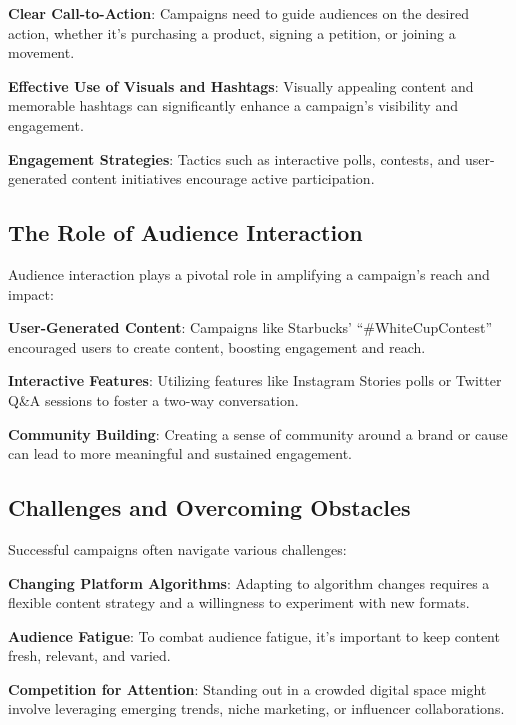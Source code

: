 \documentclass[
]{book}
\begin{document}
\textbf{Clear Call-to-Action}: Campaigns need to guide audiences on the desired action, whether it's purchasing a product, signing a petition, or joining a movement.

\textbf{Effective Use of Visuals and Hashtags}: Visually appealing content and memorable hashtags can significantly enhance a campaign's visibility and engagement.

\textbf{Engagement Strategies}: Tactics such as interactive polls, contests, and user-generated content initiatives encourage active participation.

\hypertarget{the-role-of-audience-interaction}{%
\subsection{The Role of Audience Interaction}\label{the-role-of-audience-interaction}}

Audience interaction plays a pivotal role in amplifying a campaign's reach and impact:

\textbf{User-Generated Content}: Campaigns like Starbucks' ``\#WhiteCupContest'' encouraged users to create content, boosting engagement and reach.

\textbf{Interactive Features}: Utilizing features like Instagram Stories polls or Twitter Q\&A sessions to foster a two-way conversation.

\textbf{Community Building}: Creating a sense of community around a brand or cause can lead to more meaningful and sustained engagement.

\hypertarget{challenges-and-overcoming-obstacles}{%
\subsection{Challenges and Overcoming Obstacles}\label{challenges-and-overcoming-obstacles}}

Successful campaigns often navigate various challenges:

\textbf{Changing Platform Algorithms}: Adapting to algorithm changes requires a flexible content strategy and a willingness to experiment with new formats.

\textbf{Audience Fatigue}: To combat audience fatigue, it's important to keep content fresh, relevant, and varied.

\textbf{Competition for Attention}: Standing out in a crowded digital space might involve leveraging emerging trends, niche marketing, or influencer collaborations.
\end{document}
